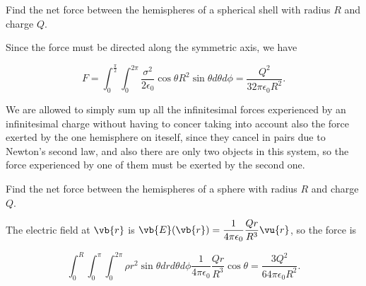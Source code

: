 \documentclass[english,a4paper,12pt]{report}
\begin{document}
{Find the net force between the hemispheres of a spherical shell with radius \(R\) and charge \(Q\).}
{Since the force must be directed along the symmetric axis, we have
		
\begin{equation}
    F = \int_{0}^{\frac{\pi }{2} } \int_{0}^{2\pi } \frac{\sigma ^2}{2 \epsilon_0} \cos \theta R^2 \sin \theta d\theta d\phi = \frac{Q^2}{32\pi  \epsilon_0 R^2 }.
\end{equation}

We are allowed to simply sum up all the infinitesimal forces experienced by an infinitesimal charge without having to concer taking into account also the force exerted by the one hemisphere on iteself, since they cancel in pairs due to Newton's second law, and also there are only two objects in this system, so the force experienced by one of them must be exerted by the second one.} 

{Find the net force between the hemispheres of a sphere with radius \(R\) and charge \(Q\).}
{The electric field at \(\vb{r} \) is \(\displaystyle \vb{E} (\vb{r} ) = \frac{1}{4\pi \epsilon_0} \frac{Qr}{R^3 } \vu{r} \), so the force is  
		
\begin{equation}
    \int_{0}^{R} \int_{0}^{\pi } \int_{0}^{2\pi }    \rho r^2\sin \theta drd\theta d\phi  \frac{1}{4\pi\epsilon_0} \frac{Qr}{R^3 } \cos \theta = \frac{3Q^2}{64\pi  \epsilon_0 R^2 }.	
\end{equation}
} 
\end{document}
